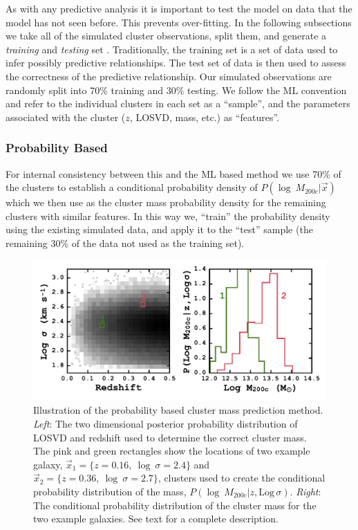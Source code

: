 \documentclass[fleqn,usenatbib]{mnras}
\begin{document}
As with any predictive analysis it is important to test the model on data that the model has not seen before. This prevents over-fitting. In the following subsections we take all of the simulated cluster observations, split them, and generate a \emph{training} and \emph{testing} set . Traditionally, the training set is a set of data used to infer possibly predictive relationships. The test set of data is then used to assess the correctness of the predictive relationship. Our simulated observations are randomly split into 70\% training and 30\% testing. We follow the ML convention and refer to the individual clusters in each set as a ``sample'', and the parameters associated with the cluster ($z$, LOSVD, mass, etc.) as ``features''.

\subsubsection{Probability Based}\label{sec:probability method}
For internal consistency between this and the ML based method we use 70\% of the clusters to establish a conditional probability density of $P(\log\ M_{200c} | \vec{x})$ which we then use as the cluster mass probability density for the remaining clusters with similar features. In this way we, ``train'' the probability density using the existing simulated data, and apply it to the ``test'' sample (the remaining 30\% of the data not used as the training set).

\begin{figure}
	\includegraphics[width=\textwidth]{figures/prob_example.pdf} 
	\caption[Illustration of the probability based cluster mass prediction method.]{Illustration of the probability based cluster mass prediction method. \emph{Left}: The two dimensional posterior probability distribution of LOSVD and redshift used to determine the correct cluster mass. The pink and green rectangles show the locations of two example galaxy, $\vec{x}_1 = \{z=0.16,\ \log~\sigma=2.4\}$ and $\vec{x}_2 = \{z=0.36,\ \log~\sigma=2.7\}$, clusters used to create the conditional probability distribution of the mass, $P(\log\ M_{200c}|z, \mathrm{Log}\, \sigma)$. \emph{Right}: The conditional probability distribution of the cluster mass for the two example galaxies. See text for a complete description.}
	\label{fig: probability corner} 
\end{figure}
\end{document}

